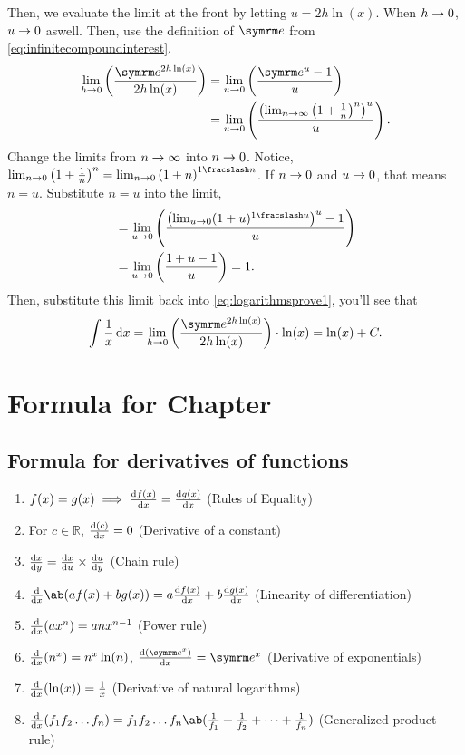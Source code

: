 Then, we evaluate the limit at the front by letting $u = 2h\ln(x)$. When $h \rightarrow 0$, $u \rightarrow 0$ aswell. Then, use the definition of $\e$ from \cref{eq:infinitecompoundinterest}.
\begin{align*}
    \lim_{h \appr 0}\left(\frac{\e^{2h\ln(x)}}{2h\ln(x)}\right) &= \lim_{u \appr 0}\left(\frac{\e^u - 1}{u}\right) \\
    &= \lim_{u \appr 0}\left(\frac{\left(\lim_{n \appr \infty}\left(1 + \frac{1}{n}\right)^n\right)^u}{u}\right).
\end{align*}
Change the limits from $n \rightarrow \infty$ into $n \rightarrow 0$. Notice, $\lim_{n \appr 0}\left(1 + \frac{1}{n}\right)^n = \lim_{n \appr 0}\left(1 + n\right)^{\flatfrac{1}{n}}$. If $n \rightarrow 0$ and $u \rightarrow 0$, that means $n = u$. Substitute $n = u$ into the limit,
\begin{align*}
    &= \lim_{u \appr 0}\left(\frac{\left(\lim_{u \appr 0}(1 + u)^{\flatfrac{1}{u}}\right)^u - 1}{u}\right) \\
    &= \lim_{u \appr 0}\left(\frac{1 + u - 1}{u}\right) = 1.
\end{align*}
Then, substitute this limit back into \cref{eq:logarithmsprove1}, you'll see that
\begin{equation*}
    \int\frac{1}{x}\odif{x} = \lim_{h \appr 0}\left(\frac{\e^{2h\ln(x)}}{2h\ln(x)}\right) \cdot \ln(x) = \ln(x) + C.
\end{equation*}

\section{Formula for Chapter \thechapter}

\everymath{\displaystyle}
\subsection{Formula for derivatives of functions}

\begin{enumerate}
    \item $f(x) = g(x) \implies \odv{f(x)}{x} = \odv{g(x)}{x}$ (Rules of Equality)
    \item For $c \in \mathbb{R}$, $\odv{(c)}{x} = 0$ (Derivative of a constant)
    \item $\odv{x}{y} = \odv{x}{u} \times \odv{u}{y}$ (Chain rule)
    \item $\odv*{\ab(af(x) + bg(x))}{x} = a\odv{f(x)}{x} + b\odv{g(x)}{x}$ (Linearity of differentiation)
    \item $\odv*{(ax^n)}{x} = anx^{n - 1}$ (Power rule)
    \item $\odv*{(n^x)}{x} = n^x\ln(n)$, $\odv{(\e^x)}{x} = \e^x$ (Derivative of exponentials)
    \item $\odv*{(\ln(x))}{x} = \frac{1}{x}$ (Derivative of natural logarithms)
    \item $\odv*{(f_1f_2\dots f_n)}{x} = f_1f_2\dots f_n\ab(\frac{1}{f_1} + \frac{1}{f_2} + \dots + \frac{1}{f_n})$ (Generalized product rule)
\end{enumerate}

